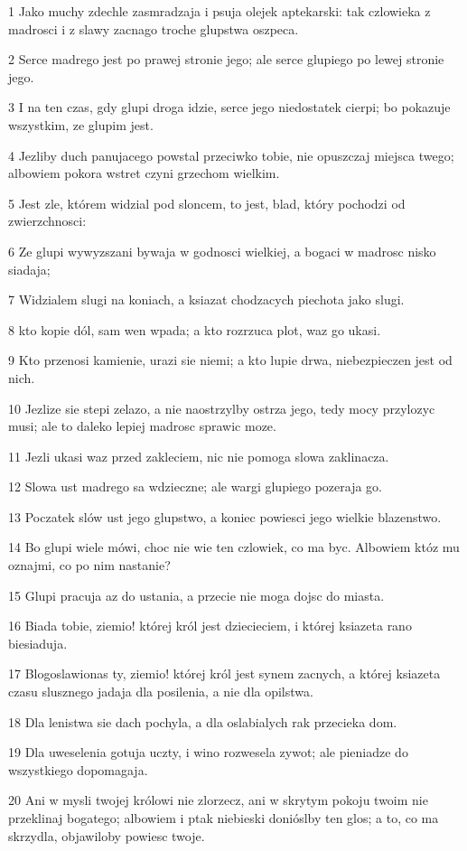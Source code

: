 \par 1 Jako muchy zdechle zasmradzaja i psuja olejek aptekarski: tak czlowieka z madrosci i z slawy zacnago troche glupstwa oszpeca.
\par 2 Serce madrego jest po prawej stronie jego; ale serce glupiego po lewej stronie jego.
\par 3 I na ten czas, gdy glupi droga idzie, serce jego niedostatek cierpi; bo pokazuje wszystkim, ze glupim jest.
\par 4 Jezliby duch panujacego powstal przeciwko tobie, nie opuszczaj miejsca twego; albowiem pokora wstret czyni grzechom wielkim.
\par 5 Jest zle, którem widzial pod sloncem, to jest, blad, który pochodzi od zwierzchnosci:
\par 6 Ze glupi wywyzszani bywaja w godnosci wielkiej, a bogaci w madrosc nisko siadaja;
\par 7 Widzialem slugi na koniach, a ksiazat chodzacych piechota jako slugi.
\par 8 kto kopie dól, sam wen wpada; a kto rozrzuca plot, waz go ukasi.
\par 9 Kto przenosi kamienie, urazi sie niemi; a kto lupie drwa, niebezpieczen jest od nich.
\par 10 Jezlize sie stepi zelazo, a nie naostrzylby ostrza jego, tedy mocy przylozyc musi; ale to daleko lepiej madrosc sprawic moze.
\par 11 Jezli ukasi waz przed zakleciem, nic nie pomoga slowa zaklinacza.
\par 12 Slowa ust madrego sa wdzieczne; ale wargi glupiego pozeraja go.
\par 13 Poczatek slów ust jego glupstwo, a koniec powiesci jego wielkie blazenstwo.
\par 14 Bo glupi wiele mówi, choc nie wie ten czlowiek, co ma byc. Albowiem któz mu oznajmi, co po nim nastanie?
\par 15 Glupi pracuja az do ustania, a przecie nie moga dojsc do miasta.
\par 16 Biada tobie, ziemio! której król jest dziecieciem, i której ksiazeta rano biesiaduja.
\par 17 Blogoslawionas ty, ziemio! której król jest synem zacnych, a której ksiazeta czasu slusznego jadaja dla posilenia, a nie dla opilstwa.
\par 18 Dla lenistwa sie dach pochyla, a dla oslabialych rak przecieka dom.
\par 19 Dla uweselenia gotuja uczty, i wino rozwesela zywot; ale pieniadze do wszystkiego dopomagaja.
\par 20 Ani w mysli twojej królowi nie zlorzecz, ani w skrytym pokoju twoim nie przeklinaj bogatego; albowiem i ptak niebieski donióslby ten glos; a to, co ma skrzydla, objawiloby powiesc twoje.

